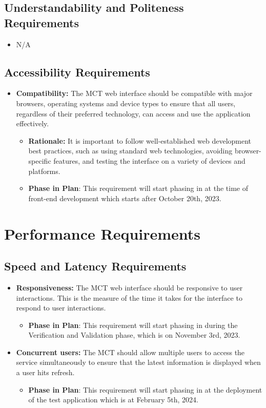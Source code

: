 \documentclass[12pt]{article}
\begin{document}
\subsection{Understandability and Politeness Requirements}
\begin{itemize}
    \item N/A
\end{itemize}
\subsection{Accessibility Requirements}

\begin{itemize}
    \item \textbf{Compatibility: }The MCT web interface should be compatible with major browsers, operating systems and device types to ensure that all users, regardless of their preferred technology, can access and use the application effectively.
    \begin{itemize}
        \item \textbf{Rationale: }It is important to follow well-established web development best practices, such as using standard web technologies, avoiding browser-specific features, and testing the interface on a variety of devices and platforms.
        \item \textbf{Phase in Plan}: This requirement will start phasing in at the time of front-end development which starts after October 20th, 2023.
    \end{itemize}
\end{itemize}



\section{Performance Requirements}
\subsection{Speed and Latency Requirements}

\begin{itemize}
    \item \textbf{Responsiveness: }The MCT web interface should be responsive to user interactions. This is the measure of the time it takes for the interface to respond to user interactions.
    \begin{itemize}
        \item \textbf{Phase in Plan}: This requirement will start phasing in during the Verification and Validation phase, which is on November 3rd, 2023.
    \end{itemize}
    \item \textbf{Concurrent users:} The MCT should allow multiple users to access the service simultaneously to ensure that the latest information is displayed when a user hits refresh.
    \begin{itemize}
        \item \textbf{Phase in Plan}: This requirement will start phasing in at the deployment of the test application which is at February 5th, 2024.
    \end{itemize}
\end{itemize}
\end{document}
